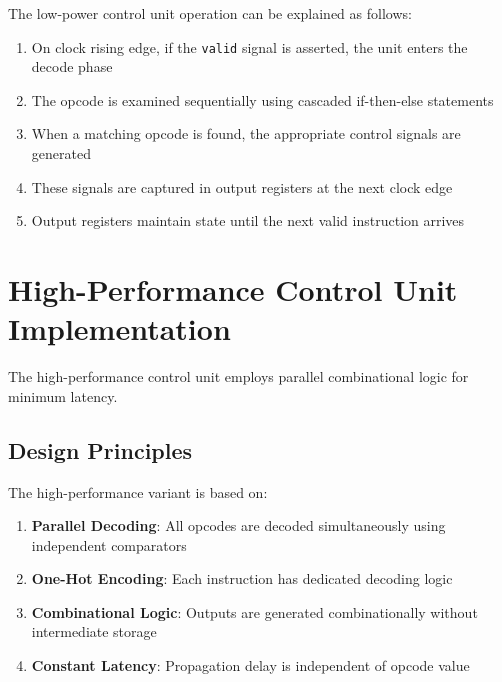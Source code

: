 \documentclass[15pt,a4paper]{report}
\begin{document}
The low-power control unit operation can be explained as follows:

\begin{enumerate}
    \item On clock rising edge, if the \texttt{valid} signal is asserted, the unit enters the decode phase
    
    \item The opcode is examined sequentially using cascaded if-then-else statements
    
    \item When a matching opcode is found, the appropriate control signals are generated
    
    \item These signals are captured in output registers at the next clock edge
    
    \item Output registers maintain state until the next valid instruction arrives
\end{enumerate}

\section{High-Performance Control Unit Implementation}

The high-performance control unit employs parallel combinational logic for minimum latency.

\subsection{Design Principles}

The high-performance variant is based on:

\begin{enumerate}
    \item \textbf{Parallel Decoding}: All opcodes are decoded simultaneously using independent comparators
    
    \item \textbf{One-Hot Encoding}: Each instruction has dedicated decoding logic
    
    \item \textbf{Combinational Logic}: Outputs are generated combinationally without intermediate storage
    
    \item \textbf{Constant Latency}: Propagation delay is independent of opcode value
\end{enumerate}
\end{document}
